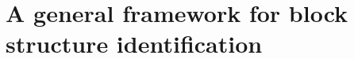 
\chapter[\texorpdfstring{A general framework for block structure identification
    }{A general framework for block structure identification}
]{ A general framework for block structure identification}
\label{sec:Clustering}
\minitoc